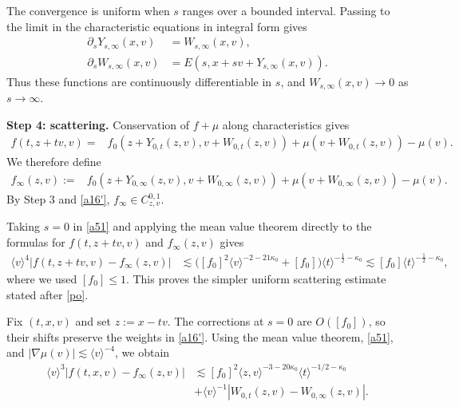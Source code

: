 \documentclass[reqno,11pt]{amsart}
\numberwithin{equation}{section}
\begin{document}
The convergence is uniform when $s$ ranges over a bounded
interval. Passing to the limit in the characteristic
equations in integral form gives
\[
\begin{split}
\partial_sY_{s,\infty}(x,v)&=W_{s,\infty}(x,v),\\
\partial_sW_{s,\infty}(x,v)
&=E(s,x+sv+Y_{s,\infty}(x,v)).
\end{split}
\]
Thus these functions are continuously differentiable
in $s$, and $W_{s,\infty}(x,v)\to0$ as $s\to\infty$.
\medskip

\textbf{Step 4: scattering.}
Conservation of $f+\mu$ along characteristics gives
\[
\begin{split}
f(t,z+tv,v)
={}&f_0(z+Y_{0,t}(z,v),v+W_{0,t}(z,v))+\mu(v+W_{0,t}(z,v))-\mu(v).
\end{split}
\]
We therefore define
\[
\begin{split}
f_\infty(z,v)
:={}&f_0(z+Y_{0,\infty}(z,v),v+W_{0,\infty}(z,v))+\mu(v+W_{0,\infty}(z,v))-\mu(v).
\end{split}
\]
By Step 3 and \eqref{a16'}, $f_\infty\in C^{0,1}_{z,v}$.

Taking $s=0$ in \eqref{a51} and applying the mean value theorem
directly to the formulas for $f(t,z+tv,v)$ and $f_\infty(z,v)$ gives
\[
\begin{split}
\langle v\rangle^4|f(t,z+tv,v)-f_\infty(z,v)|
&\lesssim\bigl([f_0]^2\langle v\rangle^{-2-21\kappa_0}
+[f_0]\bigr)\langle t\rangle^{-\frac12-\kappa_0}\lesssim[f_0]\langle t\rangle^{-\frac12-\kappa_0},
\end{split}
\]
where we used $[f_0]\leq1$. This proves the simpler uniform
scattering estimate stated after \eqref{po}.

Fix $(t,x,v)$ and set $z:=x-tv$.
The corrections at $s=0$ are $O([f_0])$, so their shifts
preserve the weights in \eqref{a16'}.
Using the mean value theorem, \eqref{a51}, and
$|\nabla\mu(v)|\lesssim\langle v\rangle^{-4}$, we obtain
\begin{equation}\label{sec8-profile-comparison}
\begin{split}
\langle v\rangle^3|f(t,x,v)-f_\infty(z,v)|
&\lesssim[f_0]^2\langle z,v\rangle^{-3-20\kappa_0}
\langle t\rangle^{-1/2-\kappa_0}\\
&+\langle v\rangle^{-1}
|W_{0,t}(z,v)-W_{0,\infty}(z,v)|.
\end{split}
\end{equation}
\end{document}
